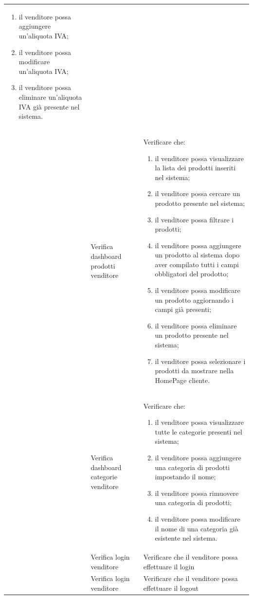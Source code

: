 \begin{center}
\begin{longtable}{|p{1cm}|p{4.85cm}|p{9cm}|}
\begin{enumerate}
		\item il venditore possa aggiungere un'aliquota IVA;
		\item il venditore possa modificare un'aliquota IVA;
		\item il venditore possa eliminare un'aliquota IVA già presente nel sistema.
	\end{enumerate} \\
	 & Verifica dashboard prodotti venditore & Verificare che:
	\begin{enumerate}
		\item il venditore possa visualizzare la lista dei prodotti inseriti nel sistema;
		\item il venditore possa cercare un prodotto presente nel sistema;
		\item il venditore possa filtrare i prodotti;
		\item il venditore possa aggiungere un prodotto al sistema dopo aver compilato tutti i campi obbligatori del prodotto;
		\item il venditore possa modificare un prodotto aggiornando i campi già presenti;
		\item il venditore possa eliminare un prodotto presente nel sistema;
		\item il venditore possa selezionare i prodotti da mostrare nella HomePage cliente.
	\end{enumerate} \\
	 & Verifica dashboard categorie venditore & Verificare che:
	\begin{enumerate}
		\item il venditore possa visualizzare tutte le categorie presenti nel sistema;
		\item il venditore possa aggiungere una categoria di prodotti impostando il nome;
		\item il venditore possa rimuovere una categoria di prodotti;
		\item il venditore possa modificare il nome di una categoria già esistente nel sistema.
	\end{enumerate} \\
	 & Verifica login venditore & Verificare che il venditore possa effettuare il login \\
	 & Verifica login venditore & Verificare che il venditore possa effettuare il logout \\
	\hline
	\end{longtable}
\end{center}


